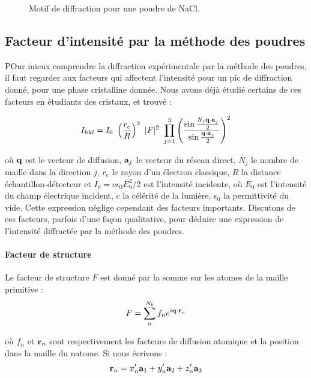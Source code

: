 \begin{figure}
    \TODO
    \caption{Motif de diffraction pour une poudre de NaCl.}
    \label{fig:poudrepic}
\end{figure}


\subsection{Facteur d'intensité par la méthode des poudres}

POur mieux comprendre la diffraction expérimentale par la méthode des poudres, il faut regarder aux facteurs qui affectent l'intensité pour un pic de diffraction donné, pour une phase cristalline donnée. Nous avons déjà étudié certains de ces facteurs en étudiants des cristaux, et trouvé :

\begin{equation}
    I_{hkl} = I_0 \ 
        \left( \frac{r_e}{R} \right)^2 \ 
        |F|^2 \ 
        \prod_{j=1}^3 \left(
            \frac{ \sin \frac{N_j \v{q \cdot a}_j}{2} }{ \sin \frac{\v{q\cdot a}_j}{2} } \right)^2
    \label{eq:facteurintensite}
\end{equation}

où $\mathbf{q}$ est le vecteur de diffusion, $\mathbf{a}_j$ le vecteur du réseau direct, $N_j$ le nombre de maille dans la direction $j$, $r_e$ le rayon d'un électron classique, $R$ la distance échantillon-détecteur et $I_0 = c\epsilon_0 E_0^2/2$ est l'intensité incidente, où $E_0$ est l'intensité du champ électrique incident, $c$ la célérité de la lumière, $\epsilon_0$ la permittivité du vide. Cette expression néglige cependant des facteurs importants. Discutons de ces facteurs, parfois d'une façon qualitative, pour déduire une expression de l'intensité diffractée par la méthode des poudres.

\paragraph{Facteur de structure}

Le facteur de structure $F$ est donné par la somme sur les atomes de la maille primitive :
\begin{equation}
    F = \sum_n^{N_b} f_n e^{i\mathbf{q\cdot r}_n}
\end{equation}

où $f_n$ et $\mathbf{r}_n$ sont respectivement les facteurs de diffusion atomique et la position dans la maille du n\ieme atome. Si nous écrivons :
\begin{equation}
    \mathbf{r}_n = x'_n \mathbf{a}_1 + y'_n \mathbf{a}_2 + z'_n \mathbf{a}_3
\end{equation}


